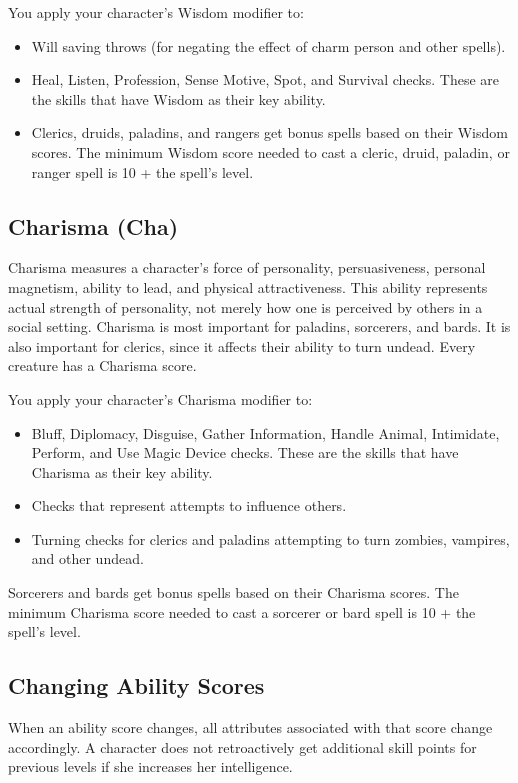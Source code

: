 \documentclass[10pt,a4paper,twocolumn]{d20}
\begin{document}
You apply your character’s Wisdom modifier to:

\begin{itemize}
\item Will saving throws (for negating the effect of charm person and other spells).
\item Heal, Listen, Profession, Sense Motive, Spot, and Survival checks. These are the skills that have Wisdom as their key ability.
\item Clerics, druids, paladins, and rangers get bonus spells based on their Wisdom scores. The minimum Wisdom score needed to cast a cleric, druid, paladin, or ranger spell is 10 + the spell’s level.
\end{itemize}

\subsection{Charisma (Cha)}
Charisma measures a character’s force of personality, persuasiveness, personal magnetism, ability to lead, and physical attractiveness. This ability represents actual strength of personality, not merely how one is perceived by others in a social setting. Charisma is most important for paladins, sorcerers, and bards. It is also important for clerics, since it affects their ability to turn undead. Every creature has a Charisma score.

You apply your character’s Charisma modifier to:

\begin{itemize}
\item Bluff, Diplomacy, Disguise, Gather Information, Handle Animal, Intimidate, Perform, and Use Magic Device checks. These are the skills that have Charisma as their key ability.
\item Checks that represent attempts to influence others.
\item Turning checks for clerics and paladins attempting to turn zombies, vampires, and other undead.
\end{itemize}

Sorcerers and bards get bonus spells based on their Charisma scores. The minimum Charisma score needed to cast a sorcerer or bard spell is 10 + the spell’s level.

\subsection{Changing Ability Scores}
When an ability score changes, all attributes associated with that score change accordingly. A character does not retroactively get additional skill points for previous levels if she increases her intelligence.
\end{document}
